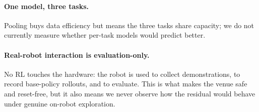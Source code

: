 \documentclass[letterpaper]{article} %
\begin{document}
\paragraph{One model, three tasks.}
Pooling buys data efficiency but means the three tasks share capacity; we do not
currently measure whether per-task models would predict better.

\paragraph{Real-robot interaction is evaluation-only.}
No RL touches the hardware: the robot is used to collect demonstrations, to
record base-policy rollouts, and to evaluate. This is what makes the venue safe
and reset-free, but it also means we never observe how the residual would behave
under genuine on-robot exploration.



\end{document}
